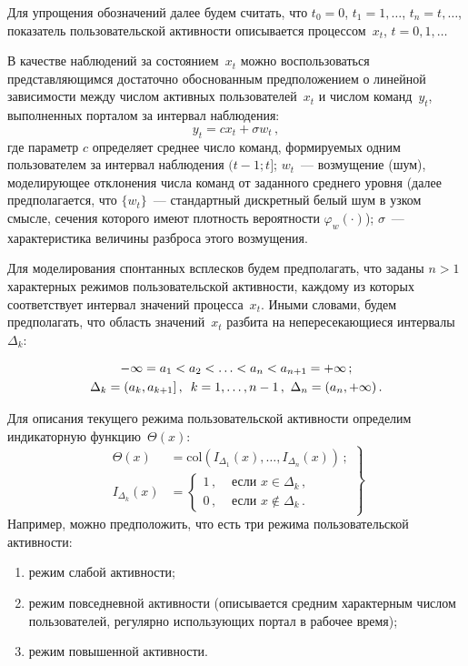 \begin{multicols}{2}
  Для упрощения обозначений далее будем считать, что $t_0=0$, $t_1=1, \ldots$, 
$t_n=t,\ldots$, показатель пользовательской активности описывается процессом~$x_t$, 
$t=0,1,\ldots$
  
  В качестве наблюдений за состоянием~$x_t$ можно воспользоваться представляющимся 
достаточно обоснованным предположением о линейной зависимости между числом 
активных пользователей~$x_t$ и числом команд~$y_t$, выполненных порталом за интервал 
наблюдения:
  \begin{equation}
  y_t=cx_t+\sigma w_t\,,
  \label{e1-b}
  \end{equation}
где параметр $c$  определяет среднее число команд, формируемых одним пользователем за 
интервал наблюдения $(t-1;t]$; $w_t$~--- возмущение (шум), моделирующее отклонения 
числа команд от заданного среднего уровня (далее предполагается, что $\{w_t\}$~--- 
стандартный дискретный белый шум в узком смыс\-ле, сечения которого имеют плот\-ность 
ве\-ро\-ят\-ности $\varphi_w(\cdot)$); $\sigma$~--- характеристика величины разброса этого 
возмущения.

  Для моделирования спонтанных всплесков будем предполагать, что заданы $n>1$ 
характерных режимов пользовательской активности, каждому из которых соответствует 
интервал значений процесса~$x_t$. Иными словами, будем предполагать, что область 
значений~$x_t$ разбита на непересекающиеся интервалы~$\Delta_k$:

\noindent
  \begin{gather*}
  -\infty = a_1<a_2<\ldots < a_n<a_{n+1}=+\infty\,;\\
  \Delta_k =(a_k,a_{k+1}]\,,\enskip k=1,\ldots ,n-1\,, \ \Delta_n=(a_n,+\infty)\,.
  \end{gather*}
  
  Для описания текущего режима пользовательской активности определим индикаторную 
функцию~$\Theta(x)$:
  \begin{equation}
  \left.
  \begin{array}{rl}
  \Theta(x) &= \mathrm{col} \left( I_{\Delta_1}(x), \ldots , I_{\Delta_n}(x)\right)\,;\\[9pt]
  I_{\Delta_k} (x) &=  \begin{cases}
  1\,, & \mbox{\ если \ } x\in \Delta_k\,,\\
  0 \,, & \mbox{\ если \ } x\not\in \Delta_k\,.
  \end{cases}
  \end{array}
  \right\}
  \label{e2-b}
  \end{equation}
  Например, можно предположить, что есть три режима пользовательской активности:
  \begin{enumerate}[(1)]
\item режим слабой активности;
\item режим повседневной активности (описывается средним характерным числом 
пользователей, регулярно использующих портал в рабочее \mbox{время});
\item режим повышенной активности.
\end{enumerate}


\end{multicols}

